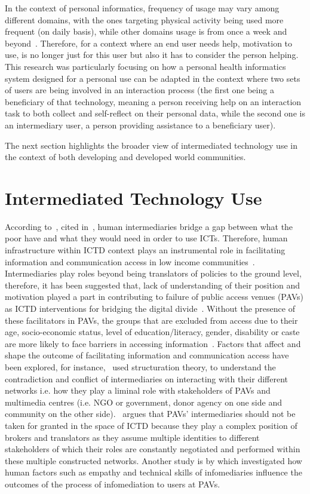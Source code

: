 In the context of personal informatics, frequency of usage may vary among different domains, with the ones targeting physical activity being used more frequent (on daily basis), while other domains usage is from once a week and beyond~\citep{epstein2015lived}. Therefore, for a context where an end user needs help, motivation to use, is no longer just for this user but also it has to consider the person helping. This research was particularly focusing on how a personal health informatics system  designed for a personal use can be adapted in the context where two sets of users are being involved in an interaction process (the first one being a beneficiary of that technology, meaning a person receiving help on an interaction task to both collect and self-reflect on their personal data, while the second one is an intermediary user, a person providing assistance to a beneficiary user).

The next section highlights the broader view of intermediated technology use in the context of both developing and developed world communities.  

\section{Intermediated Technology Use}
According to~\cite{heeks1999tyranny}, cited in~\cite{bailur2012complex}, human intermediaries bridge a gap between what the poor have and what they would need in order to use ICTs. Therefore, human infrastructure within ICTD context plays an instrumental role in facilitating information and communication access in low income communities~\citep{sambasivan2010human}. Intermediaries play roles beyond being translators of policies to the ground level, therefore, it has been suggested that, lack of understanding of their position and motivation played a part in contributing to failure of public access venues (PAVs) as ICTD interventions for bridging the digital divide~\citep{bailur2010liminal}. Without the presence of these facilitators in PAVs, the groups that are excluded from access due to their age, socio-economic status, level of education/literacy, gender, disability or caste are more likely to face barriers in accessing information~\citep{ramirez2013infomediaries}. Factors that affect and shape the outcome of facilitating information and communication access have been explored, for instance,~\cite{bailur2010liminal} used structuration theory\citep{jones2008giddens}, to understand the contradiction and conflict of intermediaries on interacting with their different networks i.e. how they play a liminal role with stakeholders of PAVs and multimedia centres (i.e. NGO or government, donor agency on one side and community on the other side).~\cite{bailur2012complex} argues that PAVs' intermediaries should not be taken for granted in the space of ICTD because they play a complex position of brokers and translators as they assume multiple identities to different stakeholders of which their roles are constantly negotiated and performed within these multiple constructed networks. Another study is by \cite{ramirez2013infomediaries} which investigated how human factors such as empathy and technical skills of infomediaries influence the outcomes of the process of infomediation to users at PAVs. 

